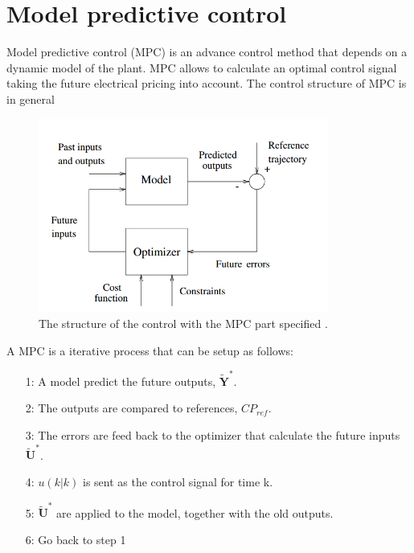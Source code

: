 \section{Model predictive control}

Model predictive control (MPC) is an advance control method that depends on a dynamic model of the plant. MPC allows to calculate an optimal control signal taking the future electrical pricing into account. The control structure of MPC is in general 

\begin{figure}[H]
\centering
\includegraphics[width=0.85\textwidth]{report/pictures/mpc}
\caption{The structure of the control with the MPC part specified \cite{Camacho2007}.}
\end{figure}

A MPC is a iterative process that can be setup as follows: 

\begin{itemize}
\item[1:] A model predict the future outputs, $\pmb{\tilde Y^*}$.
\item[2:] The outputs are compared to references, $CP_{ref}$.
\item[3:] The errors are feed back to the optimizer that calculate the future inputs $\pmb{\tilde U^*}$.
\item[4:] $u(k|k)$ is sent as the control signal for time k.
\item[5:] $\pmb{\tilde U^*}$ are applied to the model, together with the old outputs.
\item[6:] Go back to step 1 
\end{itemize}



